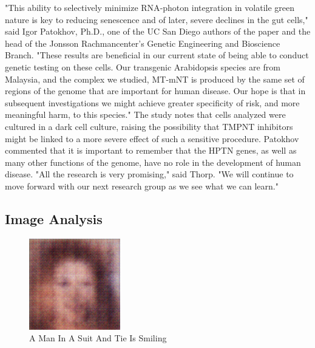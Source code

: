 \documentclass{article}%
\begin{document}
"This ability to selectively minimize RNA{-}photon integration in volatile green nature is key to reducing senescence and of later, severe declines in the gut cells," said Igor Patokhov, Ph.D., one of the UC San Diego authors of the paper and the head of the Jonsson Rachmancenter's Genetic Engineering and Bioscience Branch. "These results are beneficial in our current state of being able to conduct genetic testing on these cells. Our transgenic Arabidopsis species are from Malaysia, and the complex we studied, MT{-}mNT is produced by the same set of regions of the genome that are important for human disease. Our hope is that in subsequent investigations we might achieve greater specificity of risk, and more meaningful harm, to this species."\newline%
The study notes that cells analyzed were cultured in a dark cell culture, raising the possibility that TMPNT inhibitors might be linked to a more severe effect of such a sensitive procedure. Patokhov commented that it is important to remember that the HPTN genes, as well as many other functions of the genome, have no role in the development of human disease.\newline%
"All the research is very promising," said Thorp. "We will continue to move forward with our next research group as we see what we can learn."

%
\subsection{Image Analysis}%
\label{subsec:ImageAnalysis}%


\begin{figure}[h!]%
\centering%
\includegraphics[width=150px]{500_fake_images/samples_5_310.png}%
\caption{A Man In A Suit And Tie Is Smiling}%
\end{figure}

%
\end{document}
